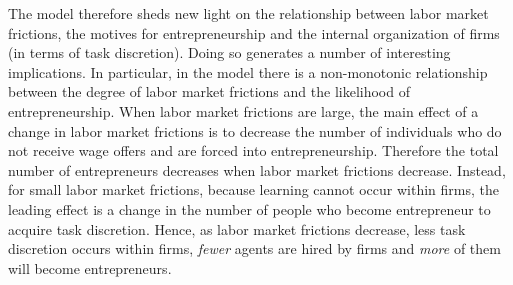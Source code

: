 \documentclass[12pt,american]{paper}
\theoremstyle{remark}
\begin{document}
The model therefore sheds new light on the relationship between labor market frictions, the motives for entrepreneurship and the internal organization of firms (in terms of task discretion). Doing so generates a number of interesting implications. In particular, in the model there is a non-monotonic relationship between the degree of labor market frictions and the likelihood of entrepreneurship. When labor market frictions are large, the main effect of a change in labor market frictions is to decrease the number of individuals who do not receive wage offers and are forced into entrepreneurship. Therefore the total number of entrepreneurs decreases when labor market frictions decrease. Instead, for small labor market frictions, because learning cannot occur within firms, the leading effect is a change in the number of people who become entrepreneur to acquire task discretion. Hence, as labor market frictions decrease, less task discretion occurs within firms, \emph{fewer} agents are hired by firms and \textit{more} of them will become entrepreneurs.  
\end{document}
